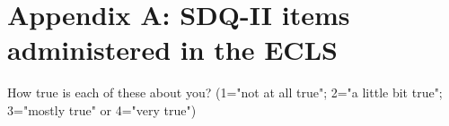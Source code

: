\documentclass[doc,floatsintext,natbib]{apa7}
\begin{document}











\newpage
\appendix



\section{Appendix A: SDQ-II items administered in the ECLS}
\label{sec:AppendixA}


How true is each of these about you? (1="not at all true"; 2="a little bit true"; 3="mostly true" or 4="very true")
\end{document}

